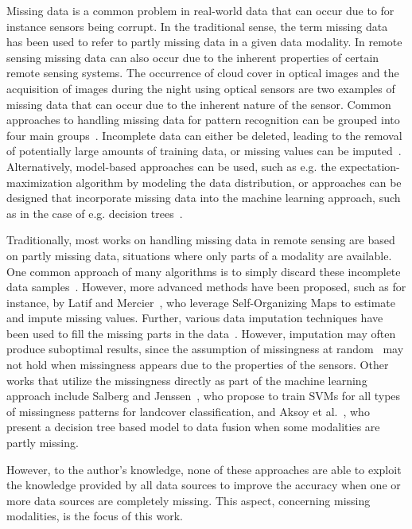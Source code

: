 \documentclass[journal]{IEEEtran}
\begin{document}
Missing data is a common problem in real-world data that can occur due to for instance sensors being corrupt. In the traditional sense, the term missing data has been used to refer to partly missing data in a given data modality. In remote sensing missing data can also occur due to the inherent properties of certain remote sensing systems. The occurrence of cloud cover in optical images and the acquisition of images during the night using optical sensors are two examples of missing data that can occur due to the inherent nature of the sensor.
Common approaches to handling missing data for pattern recognition can be grouped into four main groups~\cite{garcia2010pattern}. Incomplete data can either be deleted, leading to the removal of potentially large amounts of training data, or missing values can be imputed~\cite{schafer1997analysis}. Alternatively, model-based approaches can be used, such as e.g. the expectation-maximization algorithm by modeling the data distribution, or approaches can be designed that incorporate missing data into the machine learning approach, such as in the case of e.g. decision trees~\cite{garcia2010pattern}.

Traditionally, most works on handling missing data in remote sensing are based on partly missing data, situations where only parts of a modality are available. One common approach of many algorithms is to simply discard these incomplete data samples~\cite{aksoy2009land}. However, more advanced methods have been proposed, such as for instance, by Latif and Mercier~\cite{latif2010self}, who leverage Self-Organizing Maps to estimate and impute missing values. Further, various data imputation techniques have been used to fill the missing parts in the data~\cite{shen2015missing}. However, imputation may often produce suboptimal results, since the assumption of missingness at random~\cite{schafer1997analysis} may not hold when missingness appears due to the properties of the sensors.
Other works that utilize the missingness directly as part of the machine learning approach include Salberg and Jenssen~\cite{salberg2012land}, who propose to train SVMs for all types of missingness patterns for landcover classification, and  Aksoy et al.~\cite{aksoy2009land}, who present a decision tree based model to data fusion when some modalities are partly missing. 

However, to the author's knowledge, none of these approaches are able to exploit the knowledge provided by all data sources to improve the accuracy when one or more data sources are completely missing. This aspect, concerning missing modalities, is the focus of this work.
\end{document}
